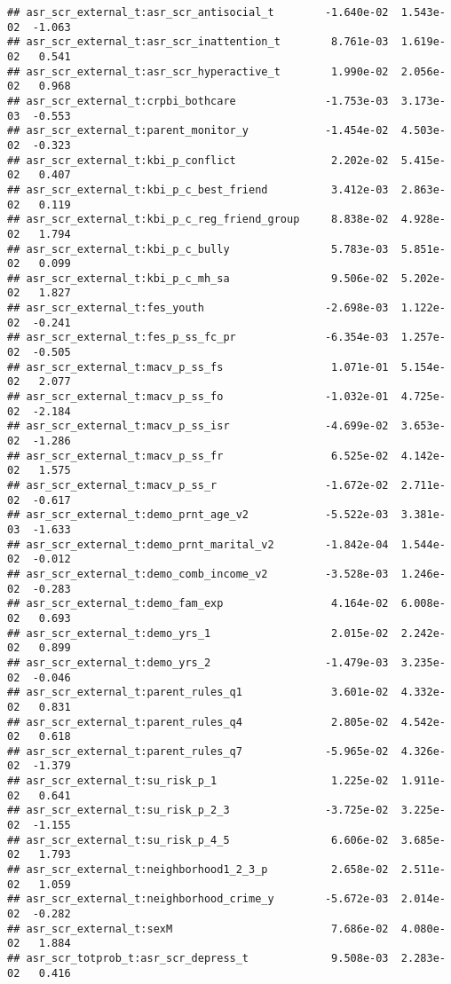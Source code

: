 \documentclass[
]{article}
\begin{document}
\begin{verbatim}
## asr_scr_external_t:asr_scr_antisocial_t        -1.640e-02  1.543e-02  -1.063
## asr_scr_external_t:asr_scr_inattention_t        8.761e-03  1.619e-02   0.541
## asr_scr_external_t:asr_scr_hyperactive_t        1.990e-02  2.056e-02   0.968
## asr_scr_external_t:crpbi_bothcare              -1.753e-03  3.173e-03  -0.553
## asr_scr_external_t:parent_monitor_y            -1.454e-02  4.503e-02  -0.323
## asr_scr_external_t:kbi_p_conflict               2.202e-02  5.415e-02   0.407
## asr_scr_external_t:kbi_p_c_best_friend          3.412e-03  2.863e-02   0.119
## asr_scr_external_t:kbi_p_c_reg_friend_group     8.838e-02  4.928e-02   1.794
## asr_scr_external_t:kbi_p_c_bully                5.783e-03  5.851e-02   0.099
## asr_scr_external_t:kbi_p_c_mh_sa                9.506e-02  5.202e-02   1.827
## asr_scr_external_t:fes_youth                   -2.698e-03  1.122e-02  -0.241
## asr_scr_external_t:fes_p_ss_fc_pr              -6.354e-03  1.257e-02  -0.505
## asr_scr_external_t:macv_p_ss_fs                 1.071e-01  5.154e-02   2.077
## asr_scr_external_t:macv_p_ss_fo                -1.032e-01  4.725e-02  -2.184
## asr_scr_external_t:macv_p_ss_isr               -4.699e-02  3.653e-02  -1.286
## asr_scr_external_t:macv_p_ss_fr                 6.525e-02  4.142e-02   1.575
## asr_scr_external_t:macv_p_ss_r                 -1.672e-02  2.711e-02  -0.617
## asr_scr_external_t:demo_prnt_age_v2            -5.522e-03  3.381e-03  -1.633
## asr_scr_external_t:demo_prnt_marital_v2        -1.842e-04  1.544e-02  -0.012
## asr_scr_external_t:demo_comb_income_v2         -3.528e-03  1.246e-02  -0.283
## asr_scr_external_t:demo_fam_exp                 4.164e-02  6.008e-02   0.693
## asr_scr_external_t:demo_yrs_1                   2.015e-02  2.242e-02   0.899
## asr_scr_external_t:demo_yrs_2                  -1.479e-03  3.235e-02  -0.046
## asr_scr_external_t:parent_rules_q1              3.601e-02  4.332e-02   0.831
## asr_scr_external_t:parent_rules_q4              2.805e-02  4.542e-02   0.618
## asr_scr_external_t:parent_rules_q7             -5.965e-02  4.326e-02  -1.379
## asr_scr_external_t:su_risk_p_1                  1.225e-02  1.911e-02   0.641
## asr_scr_external_t:su_risk_p_2_3               -3.725e-02  3.225e-02  -1.155
## asr_scr_external_t:su_risk_p_4_5                6.606e-02  3.685e-02   1.793
## asr_scr_external_t:neighborhood1_2_3_p          2.658e-02  2.511e-02   1.059
## asr_scr_external_t:neighborhood_crime_y        -5.672e-03  2.014e-02  -0.282
## asr_scr_external_t:sexM                         7.686e-02  4.080e-02   1.884
## asr_scr_totprob_t:asr_scr_depress_t             9.508e-03  2.283e-02   0.416

\end{verbatim}
\end{document}
